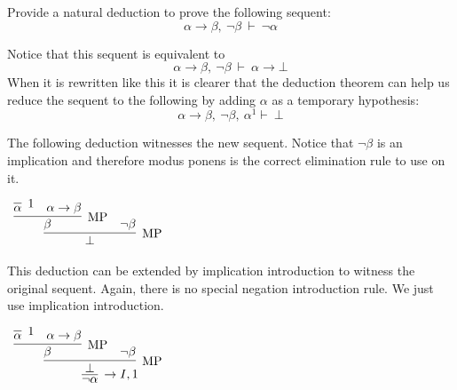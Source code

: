 \documentclass{book}
\begin{document}
    \begin{eg}
        Provide a natural deduction to prove the following sequent: $$\alpha \to \beta, \ \lnot \beta \ \vdash \ \lnot \alpha$$

        Notice that this sequent is equivalent to $$\alpha \to \beta, \ \lnot \beta \ \vdash \ \alpha \to \bot$$ When it is rewritten like this it is clearer that the deduction theorem can help us reduce the sequent to the following by adding $\alpha$ as a temporary hypothesis: $$\alpha \to \beta, \ \lnot \beta, \ \alpha^{1} \vdash \ \bot$$

        The following deduction witnesses the new sequent. Notice that $\lnot \beta$ is an implication and therefore modus ponens is the correct elimination rule to use on it. 

        \begin{center}
            $\begin{array}{c}
                \infer[\MP]{\bot}
                        {\infer[\MP]{\beta}
                            {\infer[1]{\alpha}
                                {}
                            &
                            \alpha \to \beta}
                        &
                        \lnot \beta}
            \end{array}$
        \end{center}  

        This deduction can be extended by implication introduction to witness the original sequent. Again, there is no special negation introduction rule. We just use implication introduction.

        \begin{center}
            $\begin{array}{c}
                \infer[\to I,1]{\lnot \alpha}
                    {\infer[\MP]{\bot}
                        {\infer[\MP]{\beta}
                            {\infer[1]{\alpha}
                                {}
                            &
                            \alpha \to \beta}
                        &
                        \lnot \beta}}
            \end{array}$
        \end{center}        
    \end{eg}
\end{document}

